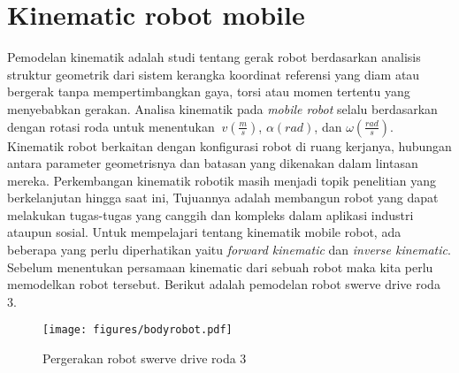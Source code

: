 \section{Kinematic robot mobile}\label{sectionkinematic}
Pemodelan kinematik adalah studi tentang gerak robot berdasarkan analisis struktur geometrik dari sistem kerangka koordinat referensi yang diam atau bergerak tanpa mempertimbangkan gaya, torsi atau momen tertentu yang menyebabkan gerakan. Analisa kinematik pada \textit{mobile robot} selalu berdasarkan dengan rotasi roda untuk menentukan $\ v (\frac{m}{s})$, $\alpha (rad)$, dan $\omega (\frac{rad}{s})$\cite{javier2016}. Kinematik robot berkaitan dengan konfigurasi robot di ruang kerjanya, hubungan antara parameter geometrisnya dan batasan yang dikenakan dalam lintasan mereka\cite{rijal2021}. Perkembangan kinematik robotik masih menjadi topik penelitian yang berkelanjutan hingga saat ini, Tujuannya adalah membangun robot yang dapat melakukan tugas-tugas yang canggih dan kompleks dalam aplikasi industri ataupun sosial. Untuk mempelajari tentang kinematik mobile robot, ada beberapa yang perlu diperhatikan yaitu \textit{forward kinematic} dan \textit{inverse kinematic}. Sebelum menentukan persamaan kinematic dari sebuah robot maka kita perlu memodelkan robot tersebut\cite{MPC22}. Berikut adalah pemodelan robot swerve drive roda 3. 
\begin{figure}[!htb]
    \centering
    \texttt{[image: figures/bodyrobot.pdf]}
    \caption{Pergerakan robot swerve drive roda 3}
    \label{bodyrobot}
\end{figure}

